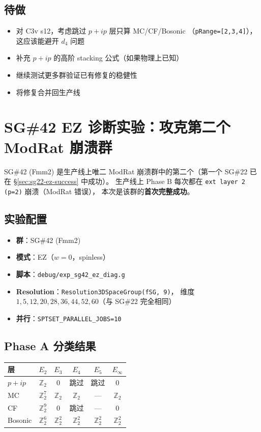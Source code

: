 \documentclass[a4paper,fontset=ubuntu,12pt]{ctexart}
\begin{document}
\subsection{待做}

\begin{itemize}
\item 对 C3v s12，考虑跳过 $p{+}ip$ 层只算 MC/CF/Bosonic
      （\texttt{pRange=[2,3,4]}），
      这应该能避开 $d_4$ 问题
\item 补充 $p{+}ip$ 的高阶 stacking 公式（如果物理上已知）
\item 继续测试更多群验证已有修复的稳健性
\item 将修复合并回生产线
\end{itemize}

\section{SG\#42 EZ 诊断实验：攻克第二个 ModRat 崩溃群}
\label{sec:sg42-ez-success}

SG\#42 (Fmm2) 是生产线上唯二 ModRat 崩溃群中的第二个（第一个 SG\#22 已在
\S\ref{sec:sg22-ez-success} 中成功）。
生产线上 Phase B 每次都在 \texttt{ext layer 2 (p=2)} 崩溃（ModRat 错误），
本次是该群的\textbf{首次完整成功}。

\subsection{实验配置}

\begin{itemize}
\item \textbf{群}：SG\#42 (Fmm2)
\item \textbf{模式}：EZ（$w = 0$，spinless）
\item \textbf{脚本}：\texttt{debug/exp\_sg42\_ez\_diag.g}
\item \textbf{Resolution}：\texttt{Resolution3DSpaceGroup(fSG, 9)}，
      维度 $1, 5, 12, 20, 28, 36, 44, 52, 60$（与 SG\#22 完全相同）
\item \textbf{并行}：\texttt{SPTSET\_PARALLEL\_JOBS=10}
\end{itemize}

\subsection{Phase A 分类结果}

\begin{center}
\begin{tabular}{l|cccc|c}
\hline
层 & $E_2$ & $E_3$ & $E_4$ & $E_5$ & $E_\infty$ \\
\hline
$p{+}ip$ & $\mathbb{Z}_2$ & $0$ & 跳过 & 跳过 & $0$ \\
MC & $\mathbb{Z}_2^7$ & $\mathbb{Z}_2$ & $\mathbb{Z}_2$ & --- & $\mathbb{Z}_2$ \\
CF & $\mathbb{Z}_2^9$ & $0$ & 跳过 & --- & $0$ \\
Bosonic & $\mathbb{Z}_2^6$ & $\mathbb{Z}_2^2$ & $\mathbb{Z}_2^2$ & $\mathbb{Z}_2^2$ & $\mathbb{Z}_2^2$ \\
\hline
\end{tabular}
\end{center}
\end{document}
